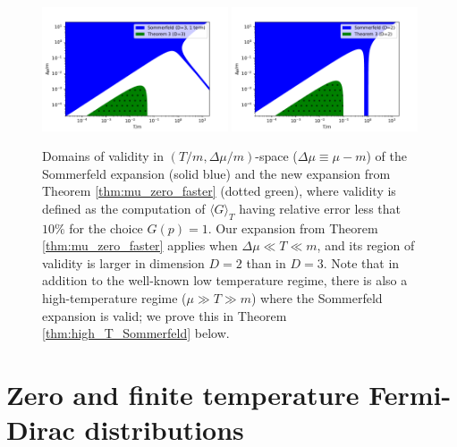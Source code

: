 \documentclass[sn-mathphys,Numbered]{sn-jnl}
\begin{document}
\begin{figure}
\centering
\includegraphics[width=0.49\textwidth]{./plot/Sommerfeld_vs_Thm3_regions_D3_1_term.pdf}
\includegraphics[width=0.49\textwidth]{./plot/Sommerfeld_vs_Thm3_regions_D2_1_term.pdf}
\caption{Domains of validity in $(T/m,\Delta\mu/m)$-space ($\Delta\mu\equiv\mu-m$) of the Sommerfeld expansion (solid blue) and the new expansion from Theorem \ref{thm:mu_zero_faster} (dotted green),  where validity is defined as the computation of $\langle G\rangle_T$ having relative error  less that $10\%$ for the choice  $G(p)=1$.  Our  expansion from Theorem \ref{thm:mu_zero_faster} applies when $\Delta\mu\ll T\ll m$, and its region of validity is larger in dimension $D=2$ than in $D=3$.  Note that in addition to the well-known low temperature regime, there is also a high-temperature regime ($\mu\gg T\gg m$) where the Sommerfeld expansion is valid; we  prove this in Theorem \ref{thm:high_T_Sommerfeld} below. }\label{fig:Thm3_vs_Sommerfeld_regions}
\end{figure}





\section{Zero and finite temperature Fermi-Dirac distributions}
\label{NewFermi}
\end{document}
